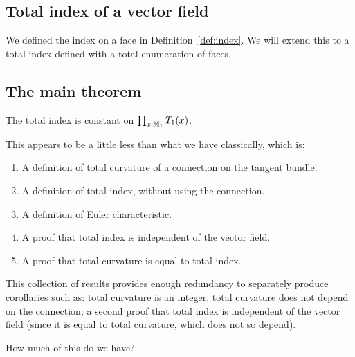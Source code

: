 \subsection{Total index of a vector field}
We defined the index on a face in Definition~\ref{def:index}. We will extend this to a total index defined with a total enumeration of faces.

\subsection{The main theorem}
\begin{mythm}
The total index is constant on \( \prod_{x:\mathbb{M}_1}T_1(x) \).
\end{mythm}

This appears to be a little less than what we have classically, which is:
\begin{enumerate}
\item A definition of total curvature of a connection on the tangent bundle.
\item A definition of total index, without using the connection.
\item A definition of Euler characteristic.
\item A proof that total index is independent of the vector field.
\item A proof that total curvature is equal to total index.
\end{enumerate}
This collection of results provides enough redundancy to separately produce corollaries such as: total curvature is an integer; total curvature does not depend on the connection; a second proof that total index is independent of the vector field (since it is equal to total curvature, which does not so depend).

How much of this do we have?

